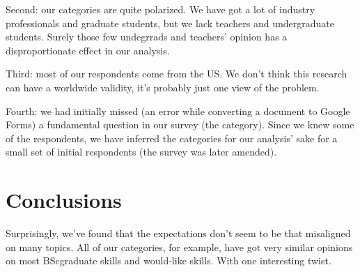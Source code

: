 \documentclass{sigchi}
\begin{document}
Second: our categories are quite polarized. We have got a lot of industry professionals and graduate students, but we lack teachers and undergraduate students. Surely those few undegrrads and teachers' opinion has a disproportionate effect in our analysis. \newline

Third: most of our respondents come from the US. We don't think this research can have a worldwide validity, it's probably just one view of the problem.\newline

Fourth: we had initially missed (an error while converting a document to Google Forms) a fundamental question in our survey (the category). Since we knew some of the respondents, we have inferred the categories for our analysis' sake for a small set of initial respondents (the survey was later amended).\newline

\section{Conclusions}
Surprisingly, we've found that the expectations don't seem to be that misaligned on many topics. All of our categories, for example, have got very similar opinions on most BScgraduate skills and would-like skills. With one interesting twist.\newline
\end{document}
